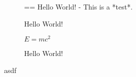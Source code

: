 \documentclass{article}
\begin{document}
\begin{figure}[h]
    \begin{typst}{}
    == Hello
    World!
    - This is a *test*.
    \end{typst}
    \caption{Hello World!}
\end{figure}

\begin{figure}[h]
    \begin{typst}{}
        $ E = m c^2 $
    \end{typst}
    \caption{Hello World!}
\end{figure}

asdf
\end{document}
